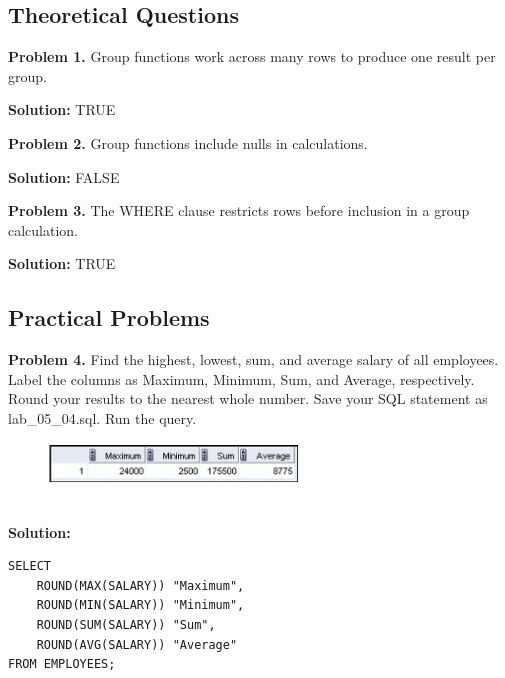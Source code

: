 \documentclass[12pt,a4paper]{article}
\begin{document}
\subsection{Theoretical Questions}

\indent \indent \textbf{Problem 1.} Group functions work across many rows to produce one result per group.

\textbf{Solution:} TRUE

\vspace{0.5cm}

\textbf{Problem 2.} Group functions include nulls in calculations.

\textbf{Solution:} FALSE

\vspace{0.5cm}

\textbf{Problem 3.} The WHERE clause restricts rows before inclusion in a group \\\indent calculation.

\textbf{Solution:} TRUE

\vspace{0.5cm}

\subsection{Practical Problems}

\textbf{Problem 4.} Find the highest, lowest, sum, and average salary of all employees. Label the columns as Maximum, Minimum, Sum, and Average, respectively. Round your results to the nearest whole number. Save your SQL statement as lab\_05\_04.sql. Run the query.
\begin{figure}[htbp]
  \centering
  \includegraphics[width=0.6\textwidth]{Screenshots/54.png}
\end{figure}\\
\textbf{Solution:}
\begin{lstlisting}[style=sqlstyle]
SELECT 
    ROUND(MAX(SALARY)) "Maximum",
    ROUND(MIN(SALARY)) "Minimum",
    ROUND(SUM(SALARY)) "Sum",
    ROUND(AVG(SALARY)) "Average"
FROM EMPLOYEES;
\end{lstlisting}

\vspace{0.5cm}
\end{document}
